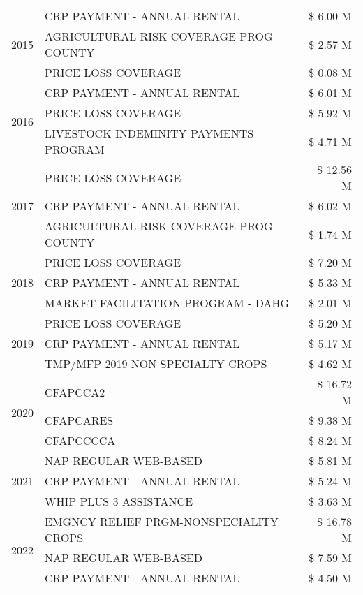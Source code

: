 \begin{tabular}{llr}
\cline{1-3}
\multirow[t]{3}{*}{2015} & CRP PAYMENT - ANNUAL RENTAL & \$ 6.00 M \\
 & AGRICULTURAL RISK COVERAGE PROG - COUNTY & \$ 2.57 M \\
 & PRICE LOSS COVERAGE & \$ 0.08 M \\
\cline{1-3}
\multirow[t]{3}{*}{2016} & CRP PAYMENT - ANNUAL RENTAL & \$ 6.01 M \\
 & PRICE LOSS COVERAGE & \$ 5.92 M \\
 & LIVESTOCK INDEMINITY PAYMENTS PROGRAM & \$ 4.71 M \\
\cline{1-3}
\multirow[t]{3}{*}{2017} & PRICE LOSS COVERAGE & \$ 12.56 M \\
 & CRP PAYMENT - ANNUAL RENTAL & \$ 6.02 M \\
 & AGRICULTURAL RISK COVERAGE PROG - COUNTY & \$ 1.74 M \\
\cline{1-3}
\multirow[t]{3}{*}{2018} & PRICE LOSS COVERAGE & \$ 7.20 M \\
 & CRP PAYMENT - ANNUAL RENTAL & \$ 5.33 M \\
 & MARKET FACILITATION PROGRAM - DAHG & \$ 2.01 M \\
\cline{1-3}
\multirow[t]{3}{*}{2019} & PRICE LOSS COVERAGE & \$ 5.20 M \\
 & CRP PAYMENT - ANNUAL RENTAL & \$ 5.17 M \\
 & TMP/MFP 2019 NON SPECIALTY CROPS & \$ 4.62 M \\
\cline{1-3}
\multirow[t]{3}{*}{2020} & CFAPCCA2 & \$ 16.72 M \\
 & CFAPCARES & \$ 9.38 M \\
 & CFAPCCCCA & \$ 8.24 M \\
\cline{1-3}
\multirow[t]{3}{*}{2021} & NAP REGULAR WEB-BASED & \$ 5.81 M \\
 & CRP PAYMENT - ANNUAL RENTAL & \$ 5.24 M \\
 & WHIP PLUS 3 ASSISTANCE & \$ 3.63 M \\
\cline{1-3}
\multirow[t]{3}{*}{2022} & EMGNCY RELIEF PRGM-NONSPECIALITY CROPS & \$ 16.78 M \\
 & NAP REGULAR WEB-BASED & \$ 7.59 M \\
 & CRP PAYMENT - ANNUAL RENTAL & \$ 4.50 M \\
\cline{1-3}
\bottomrule
\end{tabular}
